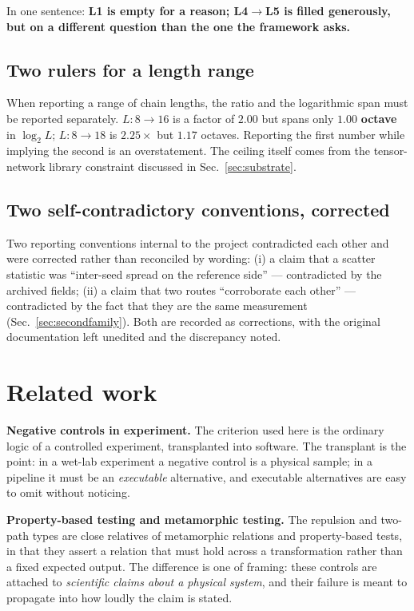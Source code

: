 \documentclass[11pt,a4paper]{article}
\begin{document}
\noindent In one sentence: \textbf{L1 is empty for a reason; L4$\to$L5 is filled
generously, but on a different question than the one the framework asks.}

\subsection{Two rulers for a length range}
\label{sec:tworulers}

When reporting a range of chain lengths, the ratio and the logarithmic span must be
reported separately. $L: 8 \to 16$ is a factor of $2.00$ but spans only
$\mathbf{1.00}$ \textbf{octave} in $\log_2 L$; $L: 8 \to 18$ is $2.25\times$ but
$1.17$ octaves. Reporting the first number while implying the second is an
overstatement. The ceiling itself comes from the tensor-network library constraint
discussed in Sec.~\ref{sec:substrate}.

\subsection{Two self-contradictory conventions, corrected}

Two reporting conventions internal to the project contradicted each other and were
corrected rather than reconciled by wording: (i) a claim that a scatter statistic
was ``inter-seed spread on the reference side'' --- contradicted by the archived
fields; (ii) a claim that two routes ``corroborate each other'' --- contradicted by
the fact that they are the same measurement (Sec.~\ref{sec:secondfamily}). Both are
recorded as corrections, with the original documentation left unedited and the
discrepancy noted.

\section{Related work}
\label{sec:related}

\textbf{Negative controls in experiment.} The criterion used here is the ordinary
logic of a controlled experiment, transplanted into software. The transplant is the
point: in a wet-lab experiment a negative control is a physical sample; in a
pipeline it must be an \emph{executable} alternative, and executable alternatives
are easy to omit without noticing.

\textbf{Property-based testing and metamorphic testing.} The repulsion and two-path
types are close relatives of metamorphic relations and property-based tests, in that
they assert a relation that must hold across a transformation rather than a fixed
expected output. The difference is one of framing: these controls are attached to
\emph{scientific claims about a physical system}, and their failure is meant to
propagate into how loudly the claim is stated.
\end{document}
